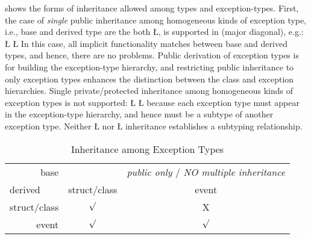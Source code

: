 \documentclass[openright,twoside]{report}
\begin{document}
 shows the forms of inheritance allowed among \CC types and \uC exception-types.
First, the case of \emph{single} public inheritance among homogeneous kinds of exception type, i.e., base and derived type are the both \LGinlinetrue\LGbegin\lgrinde\L{}\endlgrinde\LGend{}, is supported in \uC (major diagonal), e.g.:
\LGinlinefalse\LGbegin\lgrinde
\L{}
\L{}
\CE{}\endlgrinde\LGend
In this case, all implicit functionality matches between base and derived types, and hence, there are no problems.
Public derivation of exception types is for building the exception-type hierarchy, and restricting public inheritance to only exception types enhances the distinction between the class and exception hierarchies.
Single private/protected inheritance among homogeneous kinds of exception types is not supported:
\LGinlinefalse\LGbegin\lgrinde
\L{}
\CE{}\L{}
\CE{}\endlgrinde\LGend
because each exception type must appear in the exception-type hierarchy, and hence must be a subtype of another exception type.
Neither \LGinlinetrue\LGbegin\lgrinde\L{}\endlgrinde\LGend{} nor \LGinlinetrue\LGbegin\lgrinde\L{}\endlgrinde\LGend{} inheritance establishes a subtyping relationship.

\begin{table}[ht]
\begin{center}
\begin{tabular}{r||c|c}
\multicolumn{1}{r||}{base}	& \multicolumn{1}{c}{}	& \multicolumn{1}{|c}{\emph{public only} / \emph{NO multiple inheritance}}		\\
\cline{2-3}
\multicolumn{1}{l||}{derived}& struct/class		& event			\\
\hline
\hline
struct/class				& $\surd$	& \textsf{X}\\
\hline
event						& $\surd$	& $\surd$	\\
\end{tabular}
\par
\end{center}
\caption{Inheritance among Exception Types}
\label{f:InheritanceAmongExceptionTypes}
\end{table}
\end{document}
